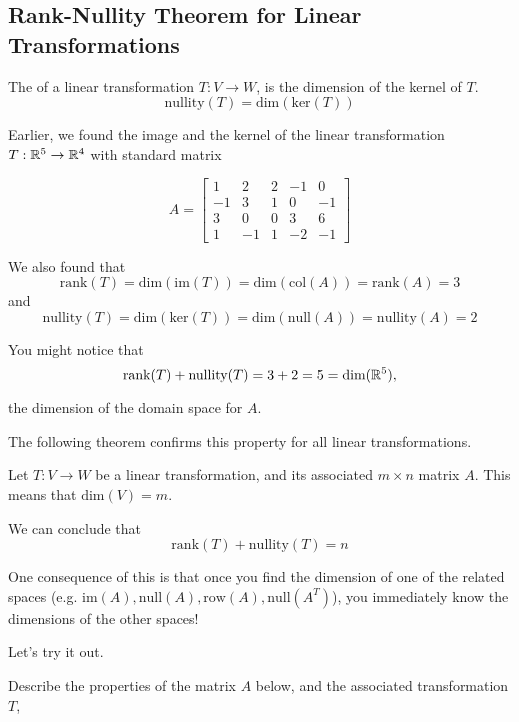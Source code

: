 \documentclass{ximera}
\begin{document}
\subsection*{Rank-Nullity Theorem for Linear Transformations}
 
\begin{definition}\label{def:nullityT}
The  of a linear transformation $T:V\rightarrow W$, is the dimension of the kernel of $T$.
$$\mbox{nullity}(T)=\mbox{dim}(\mbox{ker}(T))$$
\end{definition}

Earlier, we found the image and the kernel of the linear transformation $T:\mathbb{R}^5\rightarrow \mathbb{R}^4$ with standard matrix
 
$$A=\begin{bmatrix}1 & 2 & 2 &-1 & 0\\-1 & 3 & 1 & 0 & -1\\3 & 0 & 0 & 3 & 6\\ 1 & -1 & 1 & -2 & -1\end{bmatrix}$$
 
We also found that
$$\mbox{rank}(T)=\mbox{dim}(\mbox{im}(T))=\mbox{dim}(\mbox{col}(A))=\mbox{rank}(A)=3$$
and
$$\mbox{nullity}(T)=\mbox{dim}(\mbox{ker}(T))=\mbox{dim}(\mbox{null}(A))=\mbox{nullity}(A)=2$$
 
You might notice that
$$\mbox{rank}(T)+\mbox{nullity}(T)=3+2=5=\mbox{dim}(\mathbb{R}^5),$$

the dimension of the domain space for $A$.
 
The following theorem confirms this property for all linear transformations.
 
\begin{theorem}\label{th:ranknullityforT}
Let $T:V\rightarrow W$ be a linear transformation, and its associated $m\times n$ matrix $A$. This means that $\mbox{dim}(V)=m$.

We can conclude that
$$\mbox{rank}(T)+\mbox{nullity}(T)=n$$
\end{theorem}
 
One consequence of this is that once you find the dimension of one of the related spaces (e.g. $\mbox{im}(A), \mbox{null}(A), \mbox{row}(A), \mbox{null}(A^T)$), you immediately know the dimensions of the other spaces!

Let's try it out.


Describe the properties of the matrix $A$ below, and the associated transformation $T$,
\end{document}
